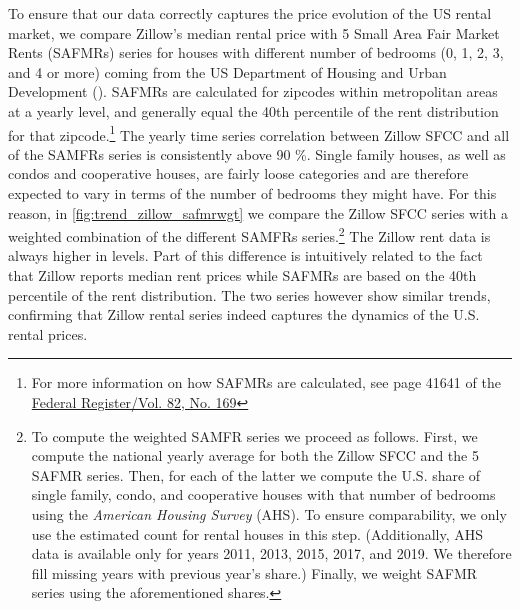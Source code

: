 To ensure that our data correctly captures the price evolution of the US rental market, we compare 
Zillow's median rental price with 5 Small Area Fair Market Rents (SAFMRs) series for houses with 
different number of bedrooms (0, 1, 2, 3, and 4 or more) coming from the US Department of Housing and 
Urban Development (\citeyear{hud}). SAFMRs are calculated for zipcodes within metropolitan areas at a 
yearly level, and generally equal the 40th percentile of the rent distribution for that 
zipcode.\footnote{For more information on how SAFMRs are calculated, see page 41641 of the 
	\href{https://www.huduser.gov/portal/datasets/fmr/fmr2018/FY2018-FMR-Preamble.pdf}{Federal Register/Vol. 82, No. 169}} 
The yearly time series correlation between Zillow SFCC and all of the SAMFRs series is consistently 
above 90 \%. Single family houses, as well as condos and cooperative houses, are fairly loose 
categories and are therefore expected to vary in terms of the number of bedrooms they might have. For 
this reason, in \autoref{fig:trend_zillow_safmrwgt} we compare the Zillow SFCC series with a weighted 
combination of the different SAMFRs series.\footnote{To compute the weighted SAMFR series we proceed 
	as follows. First, we compute the national yearly average for both the Zillow SFCC and the 5 
	SAFMR series. Then, for each of the latter we compute the U.S. share of single family, condo, 
	and cooperative houses with that number of bedrooms using the \textit{American Housing Survey} 
	(AHS). To ensure comparability, we only use the estimated count for rental houses in this step. 
	(Additionally, AHS data is available only for years 2011, 2013, 2015, 2017, and 2019. We therefore 
	fill missing years with previous year's share.) Finally, we weight SAFMR series using the 
	aforementioned shares.} 
The Zillow rent data is always higher in levels. Part of this difference is intuitively related to the 
fact that Zillow reports median rent prices while SAFMRs are based on the 40th percentile of the rent 
distribution. The two series however show similar trends, confirming that Zillow rental series indeed 
captures the dynamics of the U.S. rental prices.


